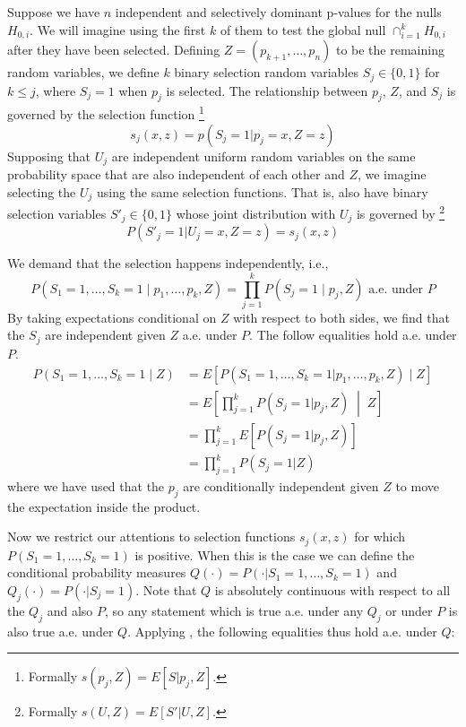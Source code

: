 \documentclass{article}
\begin{document}
\begin{appendix}
Suppose we have $n$ independent and selectively dominant p-values for the nulls $H_{0, i}$. We will imagine using the first $k$ of them to test the global null $\cap_{i=1}^k H_{0, i}$ after they have been selected. Defining $Z = (p_{k+1}, \dots, p_n)$ to be the remaining random variables, we define $k$ binary selection random variables $S_j \in \{0, 1\}$ for $k \leq j$, where $S_j = 1$ when $p_j$ is selected. The relationship between $p_j$, $Z$, and $S_j$ is governed by the selection function \footnote{Formally $s(p_j, Z) = E[S | p_j, Z]$.} 
\begin{equation*}
    s_j(x, z) = p(S_j = 1 | p_j = x, Z=z)
\end{equation*} 
Supposing that $U_j$ are independent uniform random variables on the same probability space that are also independent of each other and $Z$, we imagine selecting the $U_j$ using the same selection functions. That is, also have binary selection variables $S'_j \in \{0, 1\}$ whose joint distribution with $U_j$ is governed by \footnote{Formally $s(U, Z) = E[S' | U, Z]$.} 
\begin{equation*}
    P(S'_j = 1| U_j = x, Z = z) = s_j(x, z)
\end{equation*}

We demand that the selection happens independently, i.e., 
\begin{equation*}
    P(S_1 = 1, \dots, S_k = 1 \mid p_1, \dots, p_k, Z) = \prod_{j = 1}^k P(S_j = 1 \mid p_j, Z) \text{ a.e. under } P 
\end{equation*} 
By taking expectations conditional on $Z$ with respect to both sides, we find that the $S_j$ are independent given $Z$ a.e. under $P$. The follow equalities hold a.e. under $P$. 
\begin{align*}
    P(S_1 = 1, \dots, S_k = 1 \mid Z) &= E[P(S_1 = 1, \dots, S_k = 1 | p_1, \dots, p_k, Z) \mid Z] \\
    &= E \left[\prod_{j = 1}^k P(S_j = 1 | p_j, Z) \;\middle|\; Z\right]\\
    &= \prod_{j=1}^k E[P(S_j = 1 | p_j, Z)]\\
    &= \prod_{j=1}^k P(S_j = 1 | Z)
\end{align*}
where we have used that the $p_j$ are conditionally independent given $Z$ to move the expectation inside the product. 

Now we restrict our attentions to selection functions $s_{j}(x, z)$ for which $P(S_1=1, \dots, S_k= 1)$ is positive. When this is the case we can define the conditional probability measures $Q(\cdot) = P(\cdot| S_1=1, \dots, S_k= 1)$ and $Q_j(\cdot) = P(\cdot | S_j = 1)$. Note that $Q$ is absolutely continuous with respect to all the $Q_j$ and also $P$, so any statement which is true a.e. under any $Q_j$ or under $P$ is also true a.e. under $Q$. Applying , the following equalities thus hold a.e. under $Q$:


\end{appendix}
\end{document}
